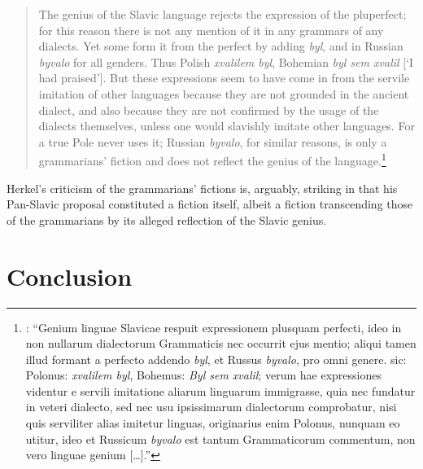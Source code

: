 \begin{quote}
    The genius of the Slavic language rejects the expression of the pluperfect; for this reason there is not any mention of it in any grammars of any dialects. Yet some form it from the perfect by adding \textit{byl}, and in Russian \textit{byvalo} for all genders. Thus Polish \textit{xvalilem byl}, Bohemian \textit{byl sem xvalil} [‘I had praised’]. But these expressions seem to have come in from the servile imitation of other languages because they are not grounded in the ancient dialect, and also because they are not confirmed by the usage of the dialects themselves, unless one would slavishly imitate other languages. For a true Pole never uses it; Russian \textit{byvalo}, for similar reasons, is only a grammarians’ fiction and does not reflect the genius of the language.\footnote{\citet[140]{herkel_elementa_1826}: “Genium linguae Slavicae respuit expressionem plusquam perfecti, ideo in non nullarum dialectorum Grammaticis nec occurrit ejus mentio; aliqui tamen illud formant a perfecto addendo \textit{byl}, et Russus \textit{byvalo}, pro omni genere. sic: Polonus: \textit{xvalilem byl}, Bohemus: \textit{Byl sem xvalil}; verum hae expressiones videntur e servili imitatione aliarum linguarum immigrasse, quia nec fundatur in veteri dialecto, sed nec usu ipsissimarum dialectorum comprobatur, nisi quis serviliter alias imitetur linguas, originarius enim Polonus, nunquam eo utitur, ideo et Russicum \textit{byvalo} est tantum Grammaticorum commentum, non vero linguae genium […].”}
\end{quote}

\noindent {}Herkel’s criticism of the grammarians’ fictions is, arguably, striking in that his Pan-Slavic proposal constituted a fiction itself, albeit a fiction transcending those of the grammarians by its alleged reflection of the Slavic genius.

\section{Conclusion}

